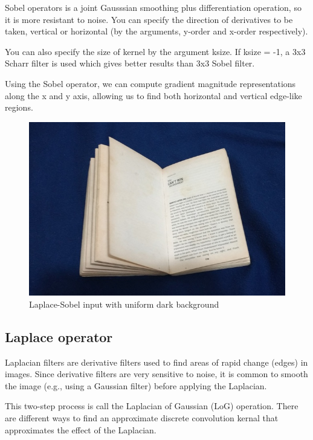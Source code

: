 \documentclass[BTech]{srmuthesis}
\begin{document}
Sobel operators is a joint Gausssian smoothing plus differentiation operation, so it is more resistant to noise. You can specify the direction of derivatives to be taken, vertical or horizontal (by the arguments, y-order and x-order respectively). 

You can also specify the size of kernel by the argument ksize. If ksize = -1, a 3x3 Scharr filter is used which gives better results than 3x3 Sobel filter.

Using the Sobel operator, we can compute gradient magnitude representations along the x and y axis, allowing us to find both horizontal and vertical edge-like regions.

\begin{figure}[h!]
    \centering
    \includegraphics[width=15cm\textwidth]{canny-edge-in1}
    \caption{Laplace-Sobel input with uniform dark background}
    \label{fig:Laplace & Sobel input with uniform dark background}
\end{figure}

\subsection{Laplace operator}

Laplacian filters are derivative filters used to find areas of rapid change (edges) in images. Since derivative filters are very sensitive to noise, it is common to smooth the image (e.g., using a Gaussian filter) before applying the Laplacian. 

This two-step process is call the Laplacian of Gaussian (LoG) operation. There are different ways to find an approximate discrete convolution kernal that approximates the effect of the Laplacian.
\end{document}
